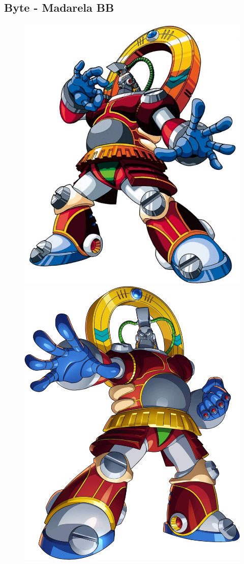 \subsection{Byte - Madarela BB}\label{boss:Byte}
\begin{figure}[htp]
	\centering
	\includegraphics[height=\portraitsize]{figures/X3/Enemies/byte.png}
	\includegraphics[height=\portraitsize]{figures/X3/Enemies/XByte.png}

\end{figure}
